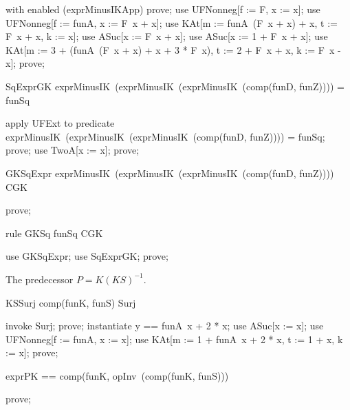 \documentclass{article}
\begin{document}
\begin{zproof}
with enabled (exprMinusIKApp) prove;
use UFNonneg[f := F, x := x];
use UFNonneg[f := funA, x := F~x + x];
use KAt[m := funA~(F~x + x) + x, t := F~x + x, k := x];
use ASuc[x := F~x + x];
use ASuc[x := 1 + F~x + x];
use KAt[m := 3 + (funA~(F~x + x) + x + 3 * F~x), t := 2 + F~x + x, k := F~x - x];
prove;
\end{zproof}

\begin{theorem}{SqExprGK}
  exprMinusIK~(exprMinusIK~(exprMinusIK~(comp(funD, funZ)))) = funSq
\end{theorem}

\begin{zproof}
apply UFExt to predicate exprMinusIK~(exprMinusIK~(exprMinusIK~(comp(funD, funZ)))) = funSq;
prove;
use TwoA[x := x];
prove;
\end{zproof}

\begin{theorem}{GKSqExpr}
  exprMinusIK~(exprMinusIK~(exprMinusIK~(comp(funD, funZ)))) \in CGK
\end{theorem}

\begin{zproof}
prove;
\end{zproof}

\begin{theorem}{rule GKSq}
  funSq \in CGK
\end{theorem}

\begin{zproof}
use GKSqExpr;
use SqExprGK;
prove;
\end{zproof}


The predecessor $P = K (K S)^{-1}$.

\begin{theorem}{KSSurj}
  comp(funK, funS) \in Surj
\end{theorem}

\begin{zproof}
invoke Surj;
prove;
instantiate y == funA~x + 2 * x;
use ASuc[x := x];
use UFNonneg[f := funA, x := x];
use KAt[m := 1 + funA~x + 2 * x, t := 1 + x, k := x];
prove;
\end{zproof}

\begin{zed}
  exprPK == comp(funK, opInv~(comp(funK, funS)))
\end{zed}

\begin{zproof}
prove;
\end{zproof}
\end{document}
